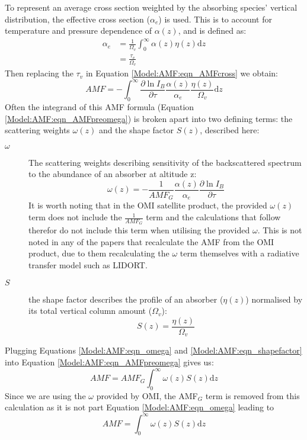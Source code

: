   To represent an average cross section weighted by the absorbing species' vertical distribution, the effective cross section ($\alpha_e$) is used.
  This is to account for temperature and pressure dependence of $\alpha(z)$, and is defined as:
  \begin{align*}
    \alpha_e &= \frac{1}{\Omega_v} \int_0^\infty \alpha(z) \eta(z) \mathrm{d}z \\
     &= \frac{\tau_v}{\Omega_v}
  \end{align*}
  Then replacing the $\tau_v$ in Equation \ref{Model:AMF:eqn_AMFcross} we obtain:
  \begin{equation} \label{Model:AMF:eqn_AMFpreomega}
    AMF=-\int_0^\infty{ \frac{\partial \ln{I_B}}{\partial \tau} \frac{\alpha(z)}{\alpha_e} \frac{\eta(z)}{\Omega_v} \mathrm{d}z }
  \end{equation}
  Often the integrand of this AMF formula (Equation \ref{Model:AMF:eqn_AMFpreomega}) is broken apart into two defining terms: the scattering weights $\omega(z)$ and the shape factor $S(z)$, described here:
  \begin{description}
    \item[$\omega$] The scattering weights describing sensitivity of the backscattered spectrum to the abundance of an absorber at altitude z:
    \begin{equation} \label{Model:AMF:eqn_omega}
      \omega(z) = -\frac{1}{AMF_G} \frac{\alpha(z)}{\alpha_e} \frac{\partial \ln{I_B}}{\partial \tau}
    \end{equation}
    It is worth noting that in the OMI satellite product, the provided $\omega(z)$ term does not include the $\frac{1}{AMF_G}$ term and the calculations that follow therefor do not include this term when utilising the provided $\omega$.
    This is not noted in any of the papers that recalculate the AMF from the OMI product, due to them recalculating the $\omega$ term themselves with a radiative transfer model such as LIDORT.
    \item[$S$] the shape factor describes the profile of an absorber ($\eta(z)$) normalised by its total vertical column amount ($\Omega_v$):
    \begin{equation} \label{Model:AMF:eqn_shapefactor}
      S(z) = \frac{\eta(z)}{\Omega_v}
    \end{equation}
  \end{description}
  
  Plugging Equations \ref{Model:AMF:eqn_omega} and \ref{Model:AMF:eqn_shapefactor} into Equation \ref{Model:AMF:eqn_AMFpreomega} gives us:
  \begin{equation} \label{Model:AMF:eqn_AMF_amfgintwSdz}
    AMF = AMF_G\int_0^\infty{ \omega(z) S(z) \mathrm{d}z}
  \end{equation}
  Since we are using the $\omega$ provided by OMI, the AMF$_G$ term is removed from this calculation as it is not part Equation \ref{Model:AMF:eqn_omega} leading to 
  \begin{equation} \label{Model:AMF:eqn_AMF_intwSdz}
    AMF = \int_0^\infty{ \omega(z) S(z) \mathrm{d}z}
  \end{equation}
  
